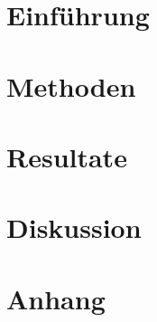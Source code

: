\documentclass[12pt, a4paper, twoside]{report}
\title{}
\author{}
\date{\today}
\begin{document}
 



 
\tableofcontents

\listoffigures

\listoftables


\chapter{Einführung}


\chapter{Methoden}


\chapter{Resultate}


\chapter{Diskussion}


\appendix
\chapter{Anhang}


\printbibliography
\end{document}
